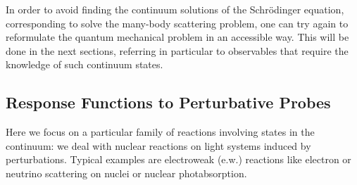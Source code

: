 In order to avoid finding the continuum solutions of the Schr\"odinger equation, corresponding to 
solve the many-body scattering problem,
one can try again to reformulate the quantum mechanical problem in an accessible way.
This will be done in the next sections,  referring in  particular to observables that require the knowledge  of such continuum states.

\subsection{Response Functions to Perturbative Probes}\label{sec:RPP}

Here we focus on a particular family of reactions involving states in the continuum: we deal with nuclear reactions on light systems 
induced by perturbations. Typical examples are electroweak (e.w.) reactions like electron or neutrino scattering on nuclei or 
nuclear photabsorption.

